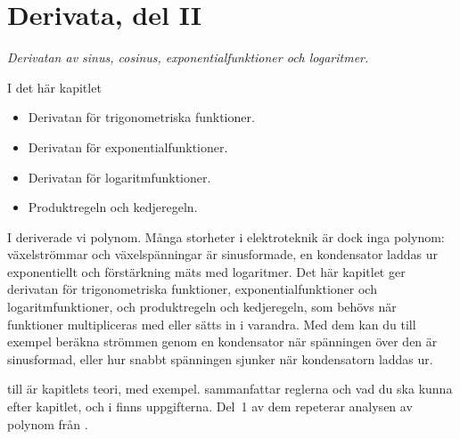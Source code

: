 
\chapter{Derivata, del II}
\label{c13:ch}

{\large\itshape Derivatan av sinus, cosinus, exponentialfunktioner och logaritmer.\par}

\begin{chapterbox}{I det här kapitlet}
\begin{itemize}
  \item Derivatan för trigonometriska funktioner.
  \item Derivatan för exponentialfunktioner.
  \item Derivatan för logaritmfunktioner.
  \item Produktregeln och kedjeregeln.
\end{itemize}
\end{chapterbox}

I  deriverade vi polynom. Många storheter i elektroteknik är dock inga polynom:
växelströmmar och växelspänningar är sinusformade, en kondensator laddas ur exponentiellt och
förstärkning mäts med logaritmer. Det här kapitlet ger derivatan för trigonometriska funktioner,
exponentialfunktioner och logaritmfunktioner, och produktregeln och kedjeregeln, som behövs när
funktioner multipliceras med eller sätts in i varandra. Med dem kan du till exempel beräkna strömmen genom
en kondensator när spänningen över den är sinusformad, eller hur snabbt spänningen sjunker när
kondensatorn laddas ur.

 till  är kapitlets teori, med exempel.
 sammanfattar reglerna och vad du ska kunna efter kapitlet, och i
 finns uppgifterna. Del~1 av dem repeterar analysen av polynom från
.




